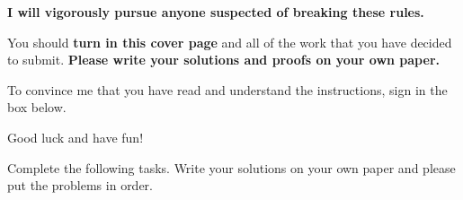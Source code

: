 \documentclass[11pt]{scrartcl}
\theoremstyle{definition}
\begin{document}
\begin{center}
\textbf{I will vigorously pursue anyone suspected of breaking these rules.}
\end{center}

\bigskip

You should \textbf{turn in this cover page} and all of the work that you have decided to submit. \textbf{Please write your solutions and proofs on your own paper.}

\bigskip

To convince me that you have read and understand the instructions, sign in the box below.

\bigskip


\bigskip

Good luck and have fun!

\newpage

Complete the following tasks.  Write your solutions on your own paper and please put the problems in order.
\end{document}
